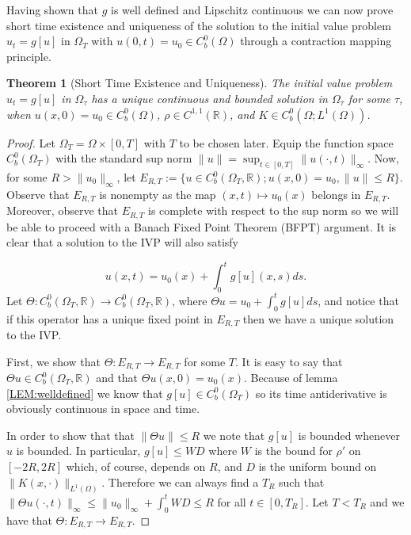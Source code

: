\documentclass[aps,
preprint,
groupedaddress,
showkeys,
amsmath]{revtex4-2}
\newtheorem{theorem}{Theorem}
\begin{document}
        Having shown that $g$ is well defined and Lipschitz continuous we can now prove short time existence and uniqueness of the solution to the initial value problem $u_t=g[u]$ in $\Omega_T$ with $u(0,t)=u_0\in C^0_b(\Omega)$ through a contraction mapping principle.


    \begin{theorem}[Short Time Existence and Uniqueness] \label{THM:ShortTimeExistenceAndUniqueness}
        The initial value problem $u_t=g[u]$ in $\Omega_\tau$ has a unique continuous and bounded solution in $\Omega_\tau$ for some $\tau$, when $u(x,0)=u_0\in C_b^0(\Omega)$, $\rho\in C^{1,1}(\mathbb{R})$, and $K\in C^0_b(\Omega;L^1(\Omega))$.
    \end{theorem}
    \begin{proof}
        Let $\Omega_T=\Omega\times [0,T]$ with $T$ to be chosen later. Equip the function space $C_b^0(\Omega_T)$ with the standard sup norm $\|u\| = \sup_{t\in[0,T]}\|u(\cdot,t)\|_\infty$. 
        Now, for some $R>\|u_0\|_\infty$, let $E_{R,T}:=\{u\in C^0_b(\Omega_T,\mathbb{R});u(x,0)=u_0, \|u\|\leq R\}$. Observe that $E_{R,T}$ is nonempty as the map $(x,t)\mapsto u_0(x)$ belongs in  $E_{R,T}$. Moreover, observe that $E_{R,T}$ is complete with respect to the sup norm so we will be able to proceed with a Banach Fixed Point Theorem (BFPT) argument. It is clear that a solution to the IVP will also satisfy
        
       \[u(x,t)=u_0(x)+\int_0^tg[u](x,s)ds.\]
        Let $\Theta:C_b^0(\Omega_T,\mathbb{R})\rightarrow C_b^0(\Omega_T,\mathbb{R})$, where $\Theta u = u_0+\int_0^tg[u]ds$, and notice that if this operator has a unique fixed point in $E_{R,T}$ then we have a unique solution to the IVP. 

        First, we show that $\Theta:E_{R,T}\rightarrow E_{R,T}$ for some $T$. It is easy to say that $\Theta u\in C^0_b(\Omega_T,\mathbb{R})$ and that $\Theta u(x,0)=u_0(x)$.  Because of lemma \ref{LEM:welldefined} we know that $g[u]\in C_b^0(\Omega_T)$ so its time antiderivative is obviously continuous in space and time. 
        
        In order to show that that $\|\Theta u\| \leq R$ we note that $g[u]$ is bounded whenever $u$ is bounded. In particular, $g[u]\leq WD$ where $W$ is the bound for $\rho'$ on  $[-2R,2R]$ which, of course, depends on $R$, and $D$ is the uniform bound on $\|K(x,\cdot)\|_{L^1(\Omega)}$. Therefore we can always find a $T_R$ such that $\|\Theta u(\cdot, t)\|_\infty \leq \|u_0\|_\infty +\int_0^tWD \leq R$ for all $t\in [0,T_R]$. Let $T<T_R$ and we have that $\Theta:E_{R,T}\rightarrow E_{R,T}$. 
        

\end{proof}
\end{document}
